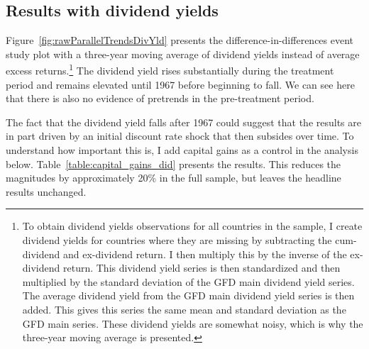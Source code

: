 

\subsection{Results with dividend yields}\label{section:did_div_yld}

Figure~\ref{fig:rawParallelTrendsDivYld} presents the difference-in-differences event study plot with a three-year moving average of dividend yields instead of average excess returns.\footnote{To obtain dividend yields observations for all countries in the sample, I create dividend yields for countries where they are missing by subtracting the cum-dividend and ex-dividend return. I then multiply this by the inverse of the ex-dividend return. This dividend yield series is then standardized and then multiplied by the standard deviation of the GFD main dividend yield series. The average dividend yield from the GFD main dividend yield series is then added. This gives this series the same mean and standard deviation as the GFD main series. These dividend yields are somewhat noisy, which is why the three-year moving average is presented.} The dividend yield rises substantially during the treatment period and remains elevated until 1967 before beginning to fall. We can see here that there is also no evidence of pretrends in the pre-treatment period.



The fact that the dividend yield falls after 1967 could suggest that the results are in part driven by an initial discount rate shock that then subsides over time. To understand how important this is, I add capital gains as a control in the analysis below. Table~\ref{table:capital_gains_did} presents the results. This reduces the magnitudes by approximately 20\% in the full sample, but leaves the headline results unchanged.

